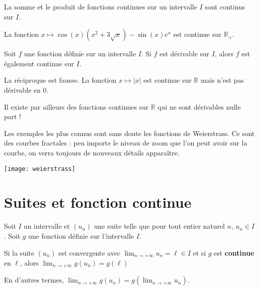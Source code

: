 \documentclass[11pt,fleqn, openany]{book} %
\begin{document}
\begin{proposition} La somme et le produit de fonctions continues sur un intervalle $I$ sont continus sur $I$.\end{proposition}

\begin{example} La fonction $x\mapsto \cos(x)(x^2+3\sqrt{x})-\sin(x)e^x$ est continue sur $\mathbb{R}_+$.\end{example}

\begin{theorem} Soit $f$ une fonction définie sur un intervalle $I$. Si $f$ est dérivable sur $I$, alors $f$ est également continue sur $I$.\end{theorem}

La réciproque est fausse. La fonction $x\mapsto |x|$ est continue sur $\mathbb{R}$ mais n'est pas dérivable en 0.

\begin{minipage}{0.6\linewidth}
Il existe par ailleurs des fonctions continues sur $\mathbb{R}$ qui ne sont dérivables nulle part ! 

Les exemples les plus connus sont sans doute les fonctions de Weierstrass. Ce sont des courbes fractales : peu importe le niveau de zoom que l'on peut avoir sur la courbe, on verra toujours de nouveaux détails apparaître.
\end{minipage}\hfill \begin{minipage}{0.35\linewidth}
\begin{center}
\texttt{[image: weierstrass]}
\end{center}
\end{minipage}



\section{Suites et fonction continue}

\begin{proposition} Soit $I$ un intervalle et $(u_n)$ une suite telle que pour tout entier naturel $n$, $u_n \in I$. Soit $g$ une fonction définie sur l'intervalle $I$. 

Si la suite $(u_n)$ est convergente avec $\displaystyle\lim_{n\to +\infty} u_n=\ell \in I$ et si $g$ est \textbf{continue} en $\ell$, alors $\displaystyle\lim_{n\to +\infty} g(u_n)=g(\ell)$

En d'autres termes, $\displaystyle\lim_{n\to +\infty}g(u_n)=g(\displaystyle\lim_{n\to +\infty} u_n)$.\end{proposition}
\end{document}
